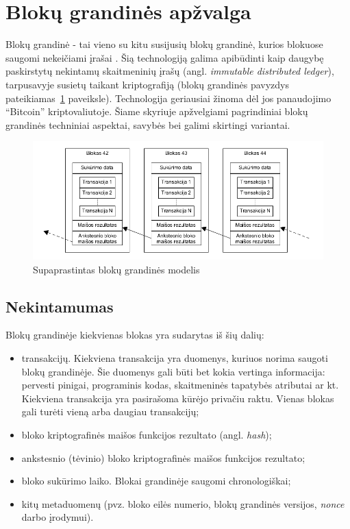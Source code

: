 \section{Blokų grandinės apžvalga} \label{section:blockchainOverview}

Blokų grandinė - tai vieno su kitu susijusių blokų grandinė, kurios blokuose saugomi
nekeičiami įrašai \cite{SatoshiNakamoto}. Šią technologiją galima apibūdinti kaip daugybę paskirstytų nekintamų skaitmeninių įrašų 
(angl. \textit{immutable distributed ledger}), tarpusavyje susietų taikant kriptografiją (blokų grandinės pavyzdys pateikiamas\hypertarget{fig:blockchain}{~\ref{fig:blockchain}} paveiksle). Technologija geriausiai žinoma dėl jos panaudojimo \enquote{Bitcoin} kriptovaliutoje.
Šiame skyriuje apžvelgiami pagrindiniai blokų grandinės techniniai aspektai, savybės bei galimi skirtingi variantai.

\begin{figure}[H]
    \centering
    \includegraphics[scale=0.6]{img/blockchain}
    \caption{Supaprastintas blokų grandinės modelis}
    \label{fig:blockchain}
\end{figure}

\subsection{Nekintamumas}

Blokų grandinėje kiekvienas blokas yra sudarytas iš šių dalių:

\begin{itemize}
    \item transakcijų. Kiekviena transakcija yra duomenys, kuriuos norima saugoti blokų grandinėje. Šie duomenys gali būti bet kokia vertinga informacija:
    pervesti pinigai, programinis kodas, skaitmeninės tapatybės atributai ar kt. Kiekviena transakcija yra pasirašoma
    kūrėjo privačiu raktu. Vienas blokas gali turėti vieną arba daugiau transakcijų;
    \item bloko kriptografinės maišos funkcijos rezultato (angl. \textit{hash});
    \item ankstesnio (tėvinio) bloko kriptografinės maišos funkcijos rezultato;
    \item bloko sukūrimo laiko. Blokai grandinėje saugomi chronologiškai;
    \item kitų metaduomenų (pvz. bloko eilės numerio, blokų grandinės versijos, \textit{nonce} darbo įrodymui).
\end{itemize}

